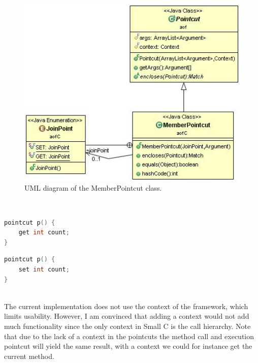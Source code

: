 \documentclass[a4paper]{report}
\begin{document}
\begin{figure}[h!]
\centering
\includegraphics[scale=0.7]{images/AOFC/MemberPointcut.jpg}
\caption{UML diagram of the MemberPointcut class.}
\label{fig:MemberPointcut}
\end{figure}\\
\begin{minipage}{0.42\textwidth}
\begin{lstlisting}[language=C, caption=Example of a member get pointcut, label=lst:SmallC_MemberPointcutGet]
pointcut p() {
	get int count;
}
\end{lstlisting}
\end{minipage}\hfill
\begin{minipage}{0.42\textwidth}
\begin{lstlisting}[language=C, caption=Example of a member set pointcut, label=lst:SmallC_MemberPointcutSet]
pointcut p() {
	set int count;
}
\end{lstlisting}
\end{minipage}
\\
The current implementation does not use the context of the framework, which limits usability. However, I am convinced that adding a context would not add much functionality since the only context in Small C is the call hierarchy. Note that due to the lack of a context in the pointcuts the method call and execution pointcut will yield the same result, with a context we could for instance get the current method.
\end{document}
